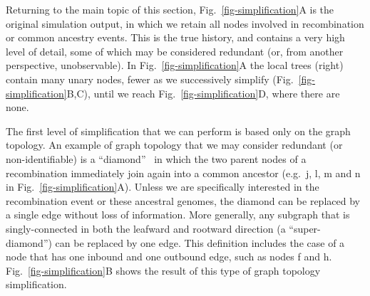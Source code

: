 \documentclass{article}
\newcommand{\noderef}[1]{\textsf{#1}}
\begin{document}
Returning to the main topic of this section,
Fig.~\ref{fig-simplification}A is the original simulation output, in
which we retain all nodes involved in recombination
or common ancestry events. This is the true history, and contains
a very high level of detail, some of which may be considered
redundant (or, from another perspective, unobservable).
In Fig.~\ref{fig-simplification}A the local trees (right)
contain many unary nodes, fewer as  we successively
simplify (Fig.~\ref{fig-simplification}B,C),
until we reach Fig.~\ref{fig-simplification}D, where there are none.

The first level of simplification that we can perform is based only
on the graph topology.
An example of graph topology that we may consider redundant
(or non-identifiable) is a
``diamond''~\citep{rasmussen2014genome}
in which the two parent nodes of a recombination immediately
join again into a common ancestor (e.g.~\noderef{j}, \noderef{l}, \noderef{m}
and \noderef{n} in Fig.~\ref{fig-simplification}A).
Unless we are specifically
interested in the recombination event or these ancestral genomes,
the diamond can be replaced by a single edge without loss of
information.
More generally, any subgraph that is singly-connected in both the leafward and
rootward direction (a ``super-diamond'') can be replaced by one edge.
This definition includes the case
of a node that has one inbound and one outbound edge, such as
nodes \noderef{f} and \noderef{h}.
Fig.~\ref{fig-simplification}B shows the result of this type of
graph topology simplification.
\end{document}

